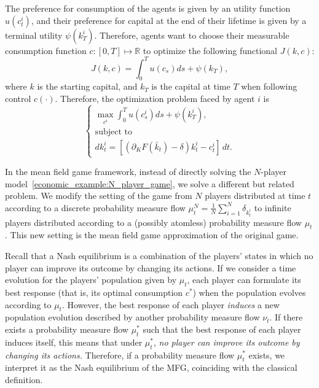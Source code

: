 The preference for consumption of the agents is given by an utility function $u(c_t^i)$, 
and their preference for capital at the end of their lifetime is given by a terminal utility $\psi(k_T^i)$.
Therefore, agents want to choose their measurable consumption function $c : [0,T] \mapsto \mathbb{R}$ to optimize the following functional $J(k, c)$:
\begin{equation}
    J(k, c) = \int_0^T u(c_s) ds + \psi(k_T),
\end{equation}
where $k$ is the starting capital, and $k_T$ is the capital at time $T$ when following control $c(\cdot)$.
Therefore, the optimization problem faced by agent $i$ is
\begin{equation}\label{economic_example:N_player_game}
    \begin{cases}
        \max_{c^i } \int_0^T u(c^i_s) ds + \psi(k^i_T),\\
        \text{subject to}\\
        d k_t^i = \left[\left( \partial_K F(\bar k_t) - \delta \right) k_t^i - c_t^i\right]\, dt.
    \end{cases}
\end{equation}

In the mean field game framework, instead of directly solving the $N$-player model~\eqref{economic_example:N_player_game},
we solve a different but related problem. 
We modify the setting of the game from $N$ players distributed at time $t$ according 
to a discrete probability measure flow $\mu^N_t = \frac{1}{N} \sum_{i = 1}^N \delta_{k^i_t}$
to infinite players distributed according to a (possibly atomless) probability measure flow $\mu_t$.
This new setting is the mean field game approximation of the original game.

Recall that a Nash equilibrium is a combination of the players' states in which 
no player can improve its outcome by changing its actions.
If we consider a time evolution for the players' population given by $\mu_t$,
each player can formulate its best response
(that is, its optimal consumption $c^*$) when the population evolves according to
$\mu_t$.
However, the best response of each player \textit{induces}
a new population evolution described by another probability measure flow $\nu_t$.
If there exists a probability measure flow $\mu_t^*$ such that the best response
of each player induces itself, this means that under $\mu_t^*$,
\textit{no player can improve its outcome by changing its actions.}
Therefore, if a probability measure flow $\mu_t^*$ exists, we interpret it as
the Nash equilibrium of the MFG, coinciding with the classical definition.

